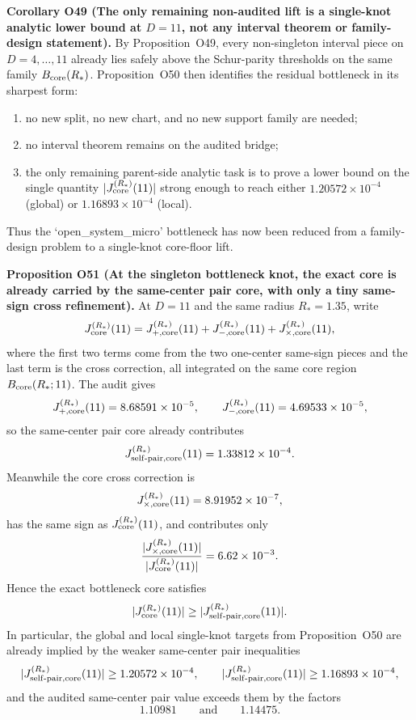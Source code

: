 \documentclass[aps,prd,onecolumn,notitlepage,nofootinbib,superscriptaddress,11pt,floatfix]{revtex4-2}
\begin{document}
\medskip\noindent\textbf{Corollary O49 (The only remaining non-audited lift is a single-knot analytic lower bound at \(D=11\), not any interval theorem or family-design statement).}
By Proposition~O49, every non-singleton interval piece on \(D=4,\dots,11\) already lies safely above the Schur-parity thresholds on the same family \(B_{\rm core}(R_\ast)\).  Proposition~O50 then identifies the residual bottleneck in its sharpest form:
\begin{enumerate}
\item no new split, no new chart, and no new support family are needed;
\item no interval theorem remains on the audited bridge;
\item the only remaining parent-side analytic task is to prove a lower bound on the single quantity \(|J_{\rm core}^{(R_\ast)}(11)|\) strong enough to reach either \(1.20572\times10^{-4}\) (global) or \(1.16893\times10^{-4}\) (local).
\end{enumerate}
Thus the `open\_system\_micro' bottleneck has now been reduced from a family-design problem to a single-knot core-floor lift.

\medskip\noindent\textbf{Proposition O51 (At the singleton bottleneck knot, the exact core is already carried by the same-center pair core, with only a tiny same-sign cross refinement).}
At \(D=11\) and the same radius \(R_\ast=1.35\), write
\[
J_{\rm core}^{(R_\ast)}(11)
=
J_{+,{\rm core}}^{(R_\ast)}(11)
+
J_{-,{\rm core}}^{(R_\ast)}(11)
+
J_{\times,{\rm core}}^{(R_\ast)}(11),
\]
where the first two terms come from the two one-center same-sign pieces and the last term is the cross correction, all integrated on the same core region \(B_{\rm core}(R_\ast;11)\).  The audit
gives
\[
J_{+,{\rm core}}^{(R_\ast)}(11)=8.68591\times10^{-5},
\qquad
J_{-,{\rm core}}^{(R_\ast)}(11)=4.69533\times10^{-5},
\]
so the same-center pair core already contributes
\[
J_{{\rm self\text{-}pair},{\rm core}}^{(R_\ast)}(11)
=
1.33812\times10^{-4}.
\]
Meanwhile the core cross correction is
\[
J_{\times,{\rm core}}^{(R_\ast)}(11)
=
8.91952\times10^{-7},
\]
has the same sign as \(J_{\rm core}^{(R_\ast)}(11)\), and contributes only
\[
\frac{|J_{\times,{\rm core}}^{(R_\ast)}(11)|}{|J_{\rm core}^{(R_\ast)}(11)|}
=
6.62\times10^{-3}.
\]
Hence the exact bottleneck core satisfies
\[
|J_{\rm core}^{(R_\ast)}(11)|
\ge
|J_{{\rm self\text{-}pair},{\rm core}}^{(R_\ast)}(11)|.
\]
In particular, the global and local single-knot targets from Proposition~O50 are already implied by the weaker same-center pair inequalities
\[
|J_{{\rm self\text{-}pair},{\rm core}}^{(R_\ast)}(11)|
\ge 1.20572\times10^{-4},
\qquad
|J_{{\rm self\text{-}pair},{\rm core}}^{(R_\ast)}(11)|
\ge 1.16893\times10^{-4},
\]
and the audited same-center pair value exceeds them by the factors
\[
1.10981
\qquad\text{and}\qquad
1.14475.
\]
\end{document}
